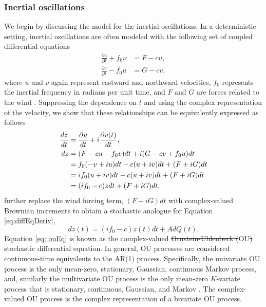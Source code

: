 \documentclass{stat572Style}
\newcommand{\vmdel}[1]{\sout{#1}}
\newcommand{\vmadd}[1]{\textbf{\color{red}{#1}}}
\begin{document}
\subsubsection{Inertial oscillations}
We begin by discussing the model for the inertial oscillations. 
In a deterministic setting, inertial oscillations are often modeled with the following set of coupled differential equations\vmadd{:}
\begin{align}
\label{eq: deterOsc}
\frac{\partial u }{\partial t}  + f_{0} \nu &= F - cu,\\ \nonumber
\frac{\partial v}{\partial t} - f_{0}u &= G - cv,
\end{align}
where $u$ and $v$ again represent eastward and northward velocities, $f_{0}$ represents the inertial frequency in radians per unit time, and $F$ and $G$ are forces related to the wind  \citep{Pollard1970}. 
Suppressing the dependence on $t$ and using the complex representation of the velocity,  we show that these relationships can be equivalently expressed as follows\vmadd{:}
\begin{align}
\label{eq:diffEqDeriv}
\nonumber
\frac{dz}{dt} &= \frac{\partial u}{dt} + i\frac{\partial v(t)}{dt}\vmadd{,} \\ \nonumber
dz &= (F - c u- f_{0}v)dt + i(G - cv + f_{0}u)dt\\ \nonumber
&= f_{0}(-v + iu)dt - c(u + iv)dt + (F + iG)dt\\ \nonumber
&= if_{0}(u + iv)dt - c(u + iv)dt + (F + iG)dt\\ 
&= (if_{0} - c)z dt + (F + iG)dt. 
\end{align}
\citet{Sykulski2016} further replace the wind forcing term, $(F + iG)dt$\vmadd{,}  with complex-valued Brownian increments \citep{Mandelbrot1968} to obtain a stochastic analogue for Equation \ref{eq:diffEqDeriv},
 \begin{equation}
\label{eq: ouEq}
dz(t) = (i f_{0} -c) z(t) dt + A d Q(t). 
\end{equation}  
Equation \eqref{eq: ouEq}  is known as the complex-valued \vmdel{Ornstein-Uhlenbeck (}OU\vmdel{)} stochastic differential equation. 
In general,  OU processes are considered continuous-time equivalents to the AR(1) process. Specifically,  the univariate OU process is the only mean-zero, stationary, Gaussian, continuous Markov process, and, similarly the multivariate OU process is the only mean-zero $K$-variate process that is stationary, continuous, Gaussian, and Markov \citep{Schach1971}.
 The complex-valued OU process is the complex representation of a bivariate OU process.  
\end{document}
